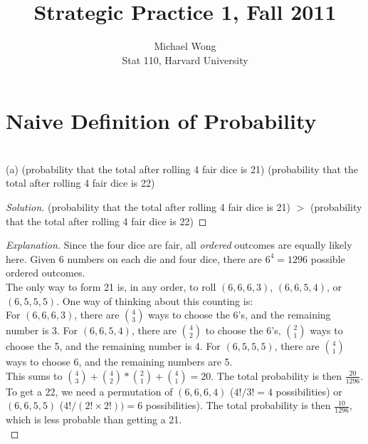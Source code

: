 \documentclass[10pt]{article}
\newenvironment{problem}[2][Problem]{\begin{trivlist}
\item[\hskip \labelsep {\bfseries #1}\hskip \labelsep {\bfseries #2.}]}{\end{trivlist}}
\begin{document}
 
\title{Strategic Practice 1, Fall 2011}
\author{Michael Wong\\
Stat 110, Harvard University}
\maketitle

\section{Naive Definition of Probability}
 
\begin{problem}{1} \\ 
(a) (probability that the total after rolling 4 fair dice is 21) \underline{\hspace{1cm}}
(probability that the total after rolling 4 fair dice is 22)
\end{problem}

\begin{proof}[Solution]

(probability that the total after rolling 4 fair dice is 21) $>$
(probability that the total after rolling 4 fair dice is 22)
\end{proof}

\begin{proof}[Explanation]

Since the four dice are fair, all \textit{ordered} outcomes are equally likely here. Given 6 numbers on each die and four dice, there are $6^4 = 1296$ possible ordered outcomes.\\ 

The only way to form 21 is, in any order, to roll $(6, 6, 6, 3)$, $(6, 6, 5, 4)$, or $(6, 5, 5, 5)$. One way of thinking about this counting is: \\ 

For $(6, 6, 6, 3)$, there are \(\binom{4}{3}\) ways to choose the 6's, and the remaining number is 3. For $(6, 6, 5, 4)$, there are \(\binom{4}{2}\) to choose the 6's, \(\binom{2}{1}\) ways to choose the 5, and the remaining number is 4. For $(6, 5, 5, 5)$, there are \(\binom{4}{1}\) ways to choose 6, and the remaining numbers are 5. \\

This sums to \(\binom{4}{3} + \binom{4}{2} * \binom{2}{1} + \binom{4}{1} = 20.\) The total probability is then \(\frac{20}{1296}\). \\ 

To get a 22, we need a permutation of $(6, 6, 6, 4)$ ($4! / 3! = 4$ possibilities) or $(6, 6, 5, 5)$ ($4! / (2! \times 2!)) = 6$ possibilities). The total probability is then \(\frac{10}{1296}\), which is less probable than getting a 21. \\
\end{proof}
\end{document}
